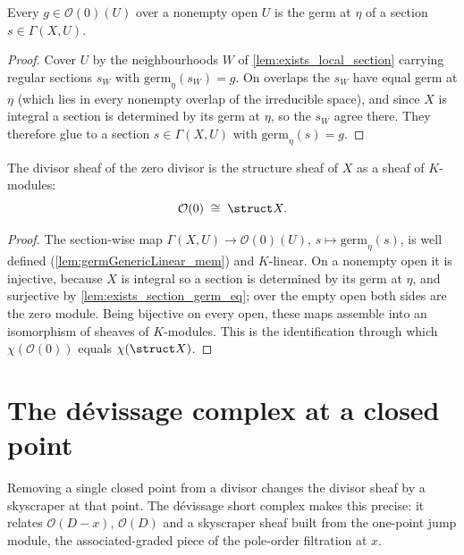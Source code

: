 \begin{lemma}
  \label{lem:exists_section_germ_eq}
  \leanok
  Every \(g \in \mathcal O(0)(U)\) over a nonempty open \(U\) is the germ at \(\eta\) of a section
  \(s \in \Gamma(X, U)\).
\end{lemma}
\begin{proof}
  \leanok
  Cover \(U\) by the neighbourhoods \(W\) of \ref{lem:exists_local_section} carrying regular
  sections \(s_W\) with \(\mathrm{germ}_\eta(s_W) = g\). On overlaps the \(s_W\) have equal germ at
  \(\eta\) (which lies in every nonempty overlap of the irreducible space), and since \(X\) is
  integral a section is determined by its germ at \(\eta\), so the \(s_W\) agree there. They
  therefore glue to a section \(s \in \Gamma(X, U)\) with \(\mathrm{germ}_\eta(s) = g\).
\end{proof}

\begin{theorem}
  \label{thm:divisorSheafZeroIso}
  \leanok
  The divisor sheaf of the zero divisor is the structure sheaf of \(X\) as a sheaf of \(K\)-modules:
  \[
    \mathcal O(0) \;\cong\; \struct X .
  \]
\end{theorem}
\begin{proof}
  \leanok
  The section-wise map \(\Gamma(X, U) \to \mathcal O(0)(U)\), \(s \mapsto \mathrm{germ}_\eta(s)\), is
  well defined (\ref{lem:germGenericLinear_mem}) and \(K\)-linear. On a nonempty open it is
  injective, because \(X\) is integral so a section is determined by its germ at \(\eta\), and
  surjective by \ref{lem:exists_section_germ_eq}; over the empty open both sides are the zero module.
  Being bijective on every open, these maps assemble into an isomorphism of sheaves of \(K\)-modules.
  This is the identification through which \(\chi(\mathcal O(0))\) equals \(\chi(\struct X)\).
\end{proof}

\section{The dévissage complex at a closed point}

Removing a single closed point from a divisor changes the divisor sheaf by a skyscraper at that
point. The dévissage short complex makes this precise: it relates \(\mathcal O(D-x)\), \(\mathcal
O(D)\) and a skyscraper sheaf built from the one-point jump module, the associated-graded piece of
the pole-order filtration at \(x\).

